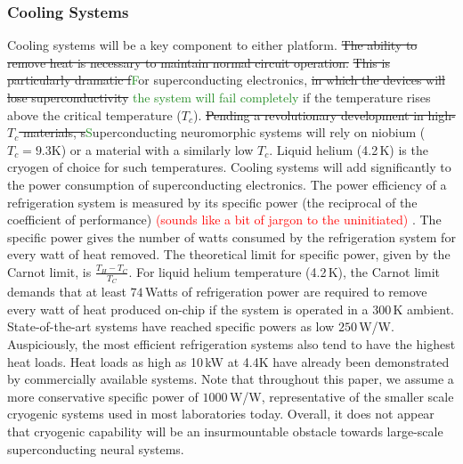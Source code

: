\documentclass[twocolumn]{article}
\begin{document}
\subsubsection{Cooling Systems}
Cooling systems will be a key component to either platform. \sout{The ability to remove heat is necessary to maintain normal circuit operation.} \sout{This is particularly dramatic f}\textcolor{ForestGreen}{F}or superconducting electronics, \sout{in which the devices will lose superconductivity} \textcolor{ForestGreen}{the system will fail completely} if the temperature rises above the critical temperature ($T_c$). \sout{Pending a revolutionary development in high-$T_c$ materials, s}\textcolor{ForestGreen}{S}uperconducting neuromorphic systems will rely on niobium ($T_c = 9.3$K) or a material with a similarly low $T_c$. Liquid helium (4.2\,K) is the cryogen of choice for such temperatures. Cooling systems will add significantly to the power consumption of superconducting electronics. The power efficiency of a refrigeration system is measured by its specific power (the reciprocal of the coefficient of performance) \textcolor{red}{(sounds like a bit of jargon to the uninitiated)} \cite{}. The specific power gives the number of watts consumed by the refrigeration system for every watt of heat removed. The theoretical limit for specific power, given by the Carnot limit, is $\frac{T_H - T_C}{T_C}$. For liquid helium temperature (4.2\,K), the Carnot limit demands that at least $74$\,Watts of refrigeration power are required to remove every watt of heat produced on-chip if the system is operated in a 300\,K ambient. State-of-the-art systems have reached specific powers as low $250$\,W/W. Auspiciously, the most efficient refrigeration systems also tend to have the highest heat loads. Heat loads as high as 10\,kW at 4.4K have already been demonstrated by commercially available systems. Note that throughout this paper, we assume a more conservative specific power of $1000$\,W/W, representative of the smaller scale cryogenic systems used in most laboratories today. Overall, it does not appear that cryogenic capability will be an insurmountable obstacle towards large-scale superconducting neural systems.
\end{document}
